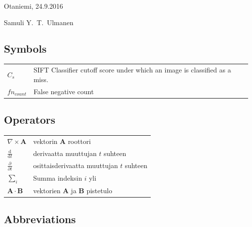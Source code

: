 \documentclass[english,12pt,a4paper,pdftex,elec,utf8]{aaltothesis}
\begin{document}
\vspace{5cm}
Otaniemi, 24.9.2016

\vspace{5mm}
{\hfill Samuli Y.\ T.\ Ulmanen \hspace{1cm}}

\newpage


\thesistableofcontents


\subsection*{Symbols}

\begin{tabular}{ll}
$C_{s}$ & SIFT Classifier cutoff score under which an image is classified as a miss.\\
$fn_{count}$ & False negative count\\
\end{tabular}

\subsection*{Operators}

\begin{tabular}{ll}
$\nabla \times \mathbf{A}$              & vektorin $\mathbf{A}$ roottori\\
$\displaystyle\frac{\mbox{d}}{\mbox{d} t}$ & derivaatta muuttujan $t$ suhteen\\
[3mm]
$\displaystyle\frac{\partial}{\partial t}$  & osittaisderivaatta muuttujan $t$ suhteen \\[3mm]
$\sum_i $                       & Summa indeksin $i$ yli\\
$\mathbf{A} \cdot \mathbf{B}$    & vektorien $\mathbf{A}$ ja $\mathbf{B}$ pistetulo
\end{tabular}

\subsection*{Abbreviations}
\end{document}

